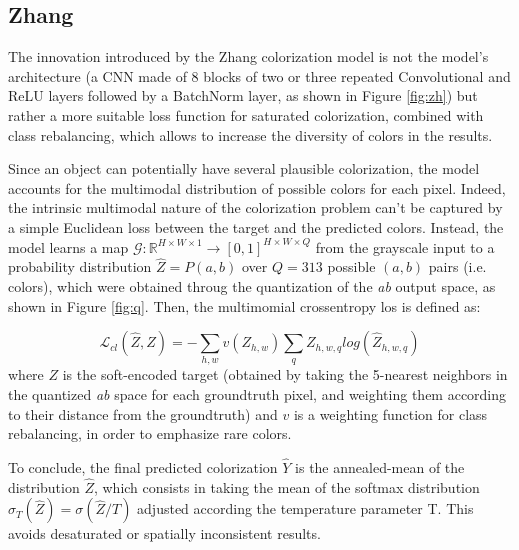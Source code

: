 \subsection{Zhang}
The innovation introduced by the Zhang colorization model is not the model's architecture (a CNN made of 8 blocks of two or three repeated Convolutional and ReLU layers followed by a BatchNorm layer, as shown in Figure \ref{fig:zh}) but rather a more suitable loss function for saturated colorization, combined with class rebalancing, which allows to increase the diversity of colors in the results. 

Since an object can potentially have several plausible colorization, the model accounts for the multimodal distribution of possible colors for each pixel. Indeed, the intrinsic multimodal nature of the colorization problem can't be captured by a simple Euclidean loss between the target and the predicted colors. Instead, the model learns a map $\mathcal{G}: \mathbb{R}^{H\times W\times1}\rightarrow [0,1]^{H\times W\times Q}$ from the grayscale input to a probability distribution $\hat{Z}=P(a,b)$ over $Q=313$ possible $(a,b)$ pairs (i.e. colors), which were obtained throug the quantization of the \textit{ab} output space, as shown in Figure \ref{fig:q}. Then, the multimomial crossentropy los is defined as:

\begin{equation*}
	\mathcal{L}_{cl} (\hat{Z},Z)= - \sum_{h,w} v(Z_{h,w})\sum_q Z_{h,w,q}log(\hat{Z}_{h,w,q})
\end{equation*}
where $Z$ is the soft-encoded target (obtained by taking the 5-nearest neighbors in the quantized \textit{ab} space for each groundtruth pixel, and weighting them according to their distance from the groundtruth) and $v$ is a weighting function for class rebalancing, in order to emphasize rare colors.

To conclude, the final predicted colorization $\hat{Y}$ is the annealed-mean of the distribution $\hat{Z}$, which consists in taking the mean of the softmax distribution $\sigma_T(\hat{Z}) = \sigma(\hat{Z}/T)$ adjusted according the temperature parameter T. This avoids desaturated or spatially inconsistent results.